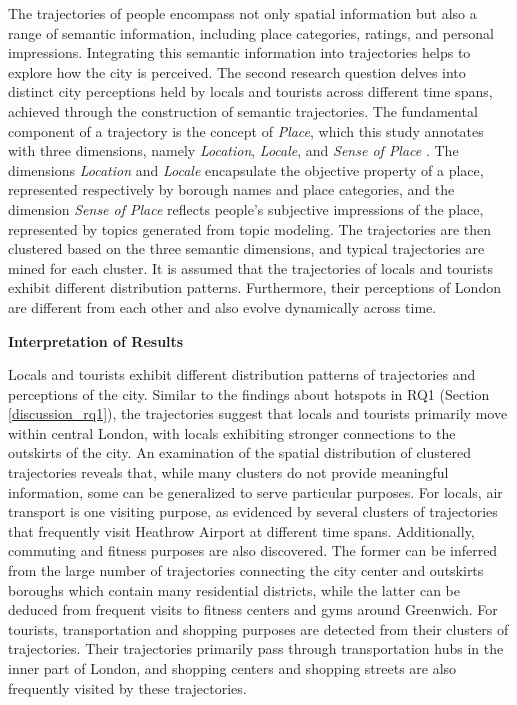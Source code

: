 \documentclass{article}
\theoremstyle{remark}
\begin{document}
The trajectories of people encompass not only spatial information but also a range of semantic information, including place categories, ratings, and personal impressions. Integrating this semantic information into trajectories helps to explore how the city is perceived. The second research question delves into distinct city perceptions held by locals and tourists across different time spans, achieved through the construction of semantic trajectories. The fundamental component of a trajectory is the concept of \textit{Place}, which this study annotates with three dimensions, namely \textit{Location}, \textit{Locale}, and \textit{Sense of Place} \citep{agnew_space_2011}. The dimensions \textit{Location} and \textit{Locale} encapsulate the objective property of a place, represented respectively by borough names and place categories, and the dimension \textit{Sense of Place} reflects people's subjective impressions of the place, represented by topics generated from topic modeling. The trajectories are then clustered based on the three semantic dimensions, and typical trajectories are mined for each cluster. It is assumed that the trajectories of locals and tourists exhibit different distribution patterns. Furthermore, their perceptions of London are different from each other and also evolve dynamically across time.

\textbf{Interpretation of Results}

Locals and tourists exhibit different distribution patterns of trajectories and perceptions of the city. Similar to the findings about hotspots in RQ1 (Section \ref{discussion_rq1}), the trajectories suggest that locals and tourists primarily move within central London, with locals exhibiting stronger connections to the outskirts of the city. An examination of the spatial distribution of clustered trajectories reveals that, while many clusters do not provide meaningful information, some can be generalized to serve particular purposes. For locals, air transport is one visiting purpose, as evidenced by several clusters of trajectories that frequently visit Heathrow Airport at different time spans. Additionally, commuting and fitness purposes are also discovered. The former can be inferred from the large number of trajectories connecting the city center and outskirts boroughs which contain many residential districts, while the latter can be deduced from frequent visits to fitness centers and gyms around Greenwich. For tourists, transportation and shopping purposes are detected from their clusters of trajectories. Their trajectories primarily pass through transportation hubs in the inner part of London, and shopping centers and shopping streets are also frequently visited by these trajectories.
\end{document}
